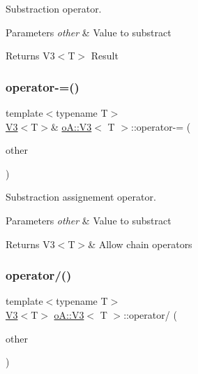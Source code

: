 Substraction operator. 


\begin{DoxyParams}{Parameters}
{\em other} & Value to substract \\
\hline
\end{DoxyParams}
\begin{DoxyReturn}{Returns}
V3$<$\+T$>$ Result 
\end{DoxyReturn}
\mbox{\label{structo_a_1_1_v3_a631255b2f80594b99423a807e1846df2}} 
\subsubsection{\texorpdfstring{operator-\/=()}{operator-=()}}
{\footnotesize\ttfamily template$<$typename T$>$ \\
\mbox{\hyperlink{structo_a_1_1_v3}{V3}}$<$T$>$\& \mbox{\hyperlink{structo_a_1_1_v3}{o\+A\+::\+V3}}$<$ T $>$\+::operator-\/= (\begin{DoxyParamCaption}\item[{const \mbox{\hyperlink{structo_a_1_1_v3}{o\+A\+::\+V3}}$<$ T $>$ \&}]{other }\end{DoxyParamCaption})\hspace{0.3cm}{\ttfamily [inline]}}



Substraction assignement operator. 


\begin{DoxyParams}{Parameters}
{\em other} & Value to substract \\
\hline
\end{DoxyParams}
\begin{DoxyReturn}{Returns}
V3$<$\+T$>$\& Allow chain operators 
\end{DoxyReturn}
\mbox{\label{structo_a_1_1_v3_a46bcba5d859f26e3ecffd4ceb7ca275f}} 
\subsubsection{\texorpdfstring{operator/()}{operator/()}}
{\footnotesize\ttfamily template$<$typename T$>$ \\
\mbox{\hyperlink{structo_a_1_1_v3}{V3}}$<$T$>$ \mbox{\hyperlink{structo_a_1_1_v3}{o\+A\+::\+V3}}$<$ T $>$\+::operator/ (\begin{DoxyParamCaption}\item[{const \mbox{\hyperlink{structo_a_1_1_v3}{o\+A\+::\+V3}}$<$ T $>$ \&}]{other }\end{DoxyParamCaption})\hspace{0.3cm}{\ttfamily [inline]}}



